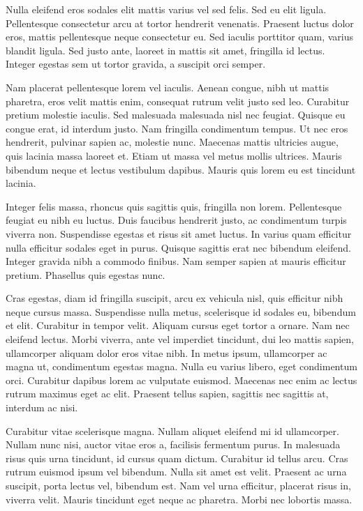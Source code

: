\documentclass{article}
\begin{document}
Nulla eleifend eros sodales elit mattis varius vel sed felis. Sed eu elit ligula. Pellentesque consectetur arcu at tortor hendrerit venenatis. Praesent luctus dolor eros, mattis pellentesque neque consectetur eu. Sed iaculis porttitor quam, varius blandit ligula. Sed justo ante, laoreet in mattis sit amet, fringilla id lectus. Integer egestas sem ut tortor gravida, a suscipit orci semper.

Nam placerat pellentesque lorem vel iaculis. Aenean congue, nibh ut mattis pharetra, eros velit mattis enim, consequat rutrum velit justo sed leo. Curabitur pretium molestie iaculis. Sed malesuada malesuada nisl nec feugiat. Quisque eu congue erat, id interdum justo. Nam fringilla condimentum tempus. Ut nec eros hendrerit, pulvinar sapien ac, molestie nunc. Maecenas mattis ultricies augue, quis lacinia massa laoreet et. Etiam ut massa vel metus mollis ultrices. Mauris bibendum neque et lectus vestibulum dapibus. Mauris quis lorem eu est tincidunt lacinia.

Integer felis massa, rhoncus quis sagittis quis, fringilla non lorem. Pellentesque feugiat eu nibh eu luctus. Duis faucibus hendrerit justo, ac condimentum turpis viverra non. Suspendisse egestas et risus sit amet luctus. In varius quam efficitur nulla efficitur sodales eget in purus. Quisque sagittis erat nec bibendum eleifend. Integer gravida nibh a commodo finibus. Nam semper sapien at mauris efficitur pretium. Phasellus quis egestas nunc.

Cras egestas, diam id fringilla suscipit, arcu ex vehicula nisl, quis efficitur nibh neque cursus massa. Suspendisse nulla metus, scelerisque id sodales eu, bibendum et elit. Curabitur in tempor velit. Aliquam cursus eget tortor a ornare. Nam nec eleifend lectus. Morbi viverra, ante vel imperdiet tincidunt, dui leo mattis sapien, ullamcorper aliquam dolor eros vitae nibh. In metus ipsum, ullamcorper ac magna ut, condimentum egestas magna. Nulla eu varius libero, eget condimentum orci. Curabitur dapibus lorem ac vulputate euismod. Maecenas nec enim ac lectus rutrum maximus eget ac elit. Praesent tellus sapien, sagittis nec sagittis at, interdum ac nisi.

Curabitur vitae scelerisque magna. Nullam aliquet eleifend mi id ullamcorper. Nullam nunc nisi, auctor vitae eros a, facilisis fermentum purus. In malesuada risus quis urna tincidunt, id cursus quam dictum. Curabitur id tellus arcu. Cras rutrum euismod ipsum vel bibendum. Nulla sit amet est velit. Praesent ac urna suscipit, porta lectus vel, bibendum est. Nam vel urna efficitur, placerat risus in, viverra velit. Mauris tincidunt eget neque ac pharetra. Morbi nec lobortis massa.
\end{document}
